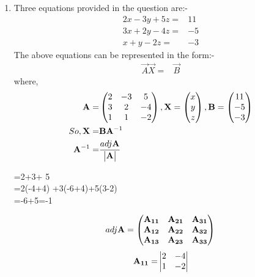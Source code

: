 \documentclass[two column]{article}
\begin{document}
            \begin{enumerate}
            \item
            Three equations provided in the question are:-
               \begin{align}
                   2x-3y+5z=&11\\
                   3x+2y-4z=&-5\\
                   x+y-2z=&-3
               \end{align}
The above equations can be represented in the form:-
                \begin{align}
                 \vec{A}\vec{X}=&\vec{B}
                 \end{align}
                 where,
                 \begin{align}
                \mathbf{\mathbf{A}}=&\begin{pmatrix}2 & -3 & 5\\ 3 & 2 & -4 \\1 & 1 & -2\end{pmatrix},
                \mathbf{\mathbf{X}}=\begin{pmatrix}x \\ y \\ z\end{pmatrix},    
                     \mathbf{\mathbf{B}}=\begin{pmatrix}11 \\ -5 \\ -3\end{pmatrix}\\
                 So,  \mathbf{X}=&\mathbf{B}\mathbf{A}^{-1}\\
                \mathbf{A}^{-1}=&\frac{adj\mathbf{A}}{\begin{vmatrix}\mathbf{A}\end{vmatrix}}
                 \end{align}
                 \begin{multiline}
                  =2+3+ 5\\
                  =2(-4+4) +3(-6+4)+5(3-2)\\
                  =-6+5=-1
                  \end{multiline}
                  \begin{align}
                   adj\mathbf{A}=\begin{pmatrix}\mathbf{A_{11}} & \mathbf{A_{21}} & \mathbf{A_{31}}\\\mathbf{ A_{12}} & \mathbf{A_{22}} &\mathbf{A_{32}}\\ \mathbf{A_{13}} &\mathbf{A_{23}} & \mathbf{A_{33}}\end{pmatrix}
                  \end{align}
                  \begin{align}
                      \vec{A_{11}}=&\mydet{2 & -4 \\ 1 & -2}\\

\end{align}
\end{enumerate}
\end{document}
